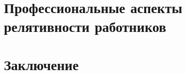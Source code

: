 \documentclass[a4paper,10pt]{extarticle}
\begin{document}


\section{Профессиональные аспекты релятивности работников}









\section{Заключение}


\end{document}

